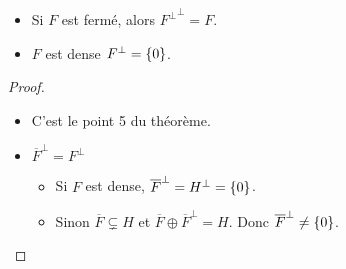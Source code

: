 \begin{coro}
	\begin{itemize}
		\item Si $F$ est fermé, alors ${F^\perp}^\perp = F$.
		\item $F$ est dense \ssi $F^\perp = \left\{0\right\}$.
	\end{itemize}
\end{coro}

\begin{proof}
	\begin{itemize}
		\item C'est le point 5 du théorème.
		\item $\overline{F}^\perp = F^\perp$

		      \begin{itemize}
			      \item Si $F$ est dense, $\overline{F}^\perp = H^\perp = \left\{0\right\}$.
			      \item Sinon $\overline{F} \subsetneq H$  et $ \overline{F} \oplus \overline{F}^\perp = H$.
			            Donc $\overline{F}^\perp \neq \left\{0\right\}$.
		      \end{itemize}
	\end{itemize}

\end{proof}
